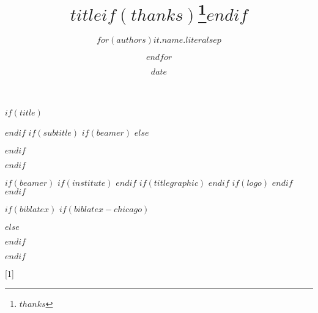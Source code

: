 $if(title)$
\title{$title$$if(thanks)$\thanks{$thanks$}$endif$}
$endif$
$if(subtitle)$
$if(beamer)$
$else$
\usepackage{etoolbox}
\makeatletter
\providecommand{\subtitle}[1]{%
  \apptocmd{\@title}{\par {\large #1 \par}}{}{}
}
\makeatother
$endif$
\subtitle{$subtitle$}
$endif$
\author{$for(authors)$$it.name.literal$$sep$ \and $endfor$}
\date{$date$}
$if(beamer)$
$if(institute)$
$endif$
$if(titlegraphic)$
$endif$
$if(logo)$
$endif$
$endif$

$if(biblatex)$
$if(biblatex-chicago)$
\usepackage[$if(biblio-style)$$biblio-style$,$endif$$for(biblatexoptions)$$biblatexoptions$$sep$,$endfor$]{biblatex-chicago}
$else$
\usepackage[$if(biblio-style)$style=$biblio-style$,$endif$$for(biblatexoptions)$$biblatexoptions$$sep$,$endfor$]{biblatex}
$endif$


$endif$


[1]{
}



\renewcommand*{\postnotedelim}{\addcolon\space}


